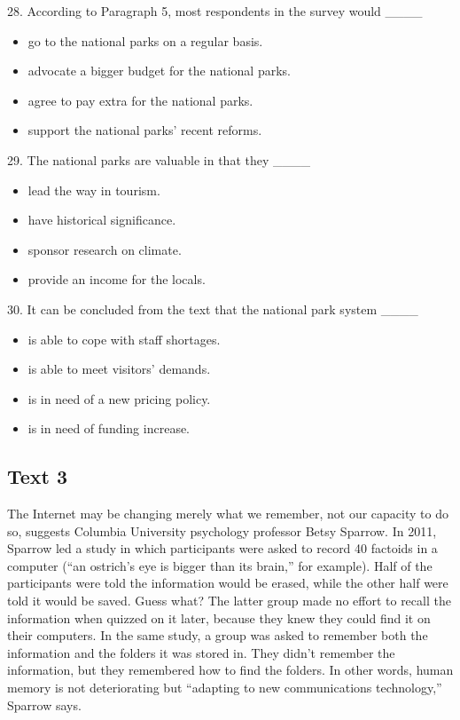 \documentclass[UTF8,11pt]{ctexart}
\begin{document}
28. According to Paragraph 5, most respondents in the survey would \_\_\_\_


\begin{itemize}[leftmargin=2em,itemsep=.2em,topsep=.4em]\item[A.] go to the national parks on a regular basis.
\item[B.] advocate a bigger budget for the national parks.
\item[C.] agree to pay extra for the national parks.
\item[D.] support the national parks’ recent reforms.
\end{itemize}

29. The national parks are valuable in that they \_\_\_\_


\begin{itemize}[leftmargin=2em,itemsep=.2em,topsep=.4em]\item[A.] lead the way in tourism.
\item[B.] have historical significance.
\item[C.] sponsor research on climate.
\item[D.] provide an income for the locals.
\end{itemize}

30. It can be concluded from the text that the national park system \_\_\_\_


\begin{itemize}[leftmargin=2em,itemsep=.2em,topsep=.4em]\item[A.] is able to cope with staff shortages.
\item[B.] is able to meet visitors’ demands.
\item[C.] is in need of a new pricing policy.
\item[D.] is in need of funding increase.
\end{itemize}

\subsection*{\textbf{Text 3}}


The Internet may be changing merely what we remember, not our capacity to do so, suggests Columbia University psychology professor Betsy Sparrow. In 2011, Sparrow led a study in which participants were asked to record 40 factoids in a computer (“an ostrich’s eye is bigger than its brain,” for example). Half of the participants were told the information would be erased, while the other half were told it would be saved. Guess what? The latter group made no effort to recall the information when quizzed on it later, because they knew they could find it on their computers. In the same study, a group was asked to remember both the information and the folders it was stored in. They didn’t remember the information, but they remembered how to find the folders. In other words, human memory is not deteriorating but “adapting to new communications technology,” Sparrow says.
\end{document}
